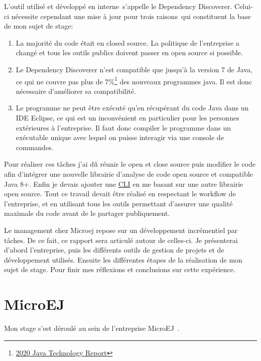 \documentclass[french,a4paper,12pt]{report}
\begin{document}
L’outil utilisé et développé en interne s’appelle le Dependency Discoverer. Celui-ci nécessite cependant une mise à jour pour trois raisons qui constituent la base de mon sujet de stage:

\begin{enumerate}
\item  La majorité du code était en closed source. La politique de l’entreprise a changé et tous les outils publics doivent passer en open source si possible.
\item Le Dependency Discoverer n’est compatible que jusqu’à la version 7 de Java, ce qui ne couvre pas plus de 7\%\footnote{\href{https://www.jrebel.com/blog/2020-java-technology-report}{2020 Java Technology Report}} des nouveaux programmes java. Il est donc nécessaire d’améliorer sa compatibilité. 
\item  Le programme ne peut être exécuté qu’en récupérant du code Java dans un IDE Eclipse, ce qui est un inconvénient en particulier pour les personnes extérieures à l’entreprise. Il faut donc compiler le programme dans un exécutable unique avec lequel on puisse interagir via une console de commandes.
\end{enumerate}

Pour réaliser ces tâches j’ai dû réunir le open et close source puis modifier le code afin d’intégrer une nouvelle librairie d’analyse de code open source et compatible Java 8+. Enfin je devais ajouter une \hyperlink{CLI}{CLI} en me basant sur une autre librairie open source.
Tout ce travail devait être réalisé en respectant le workflow de l’entreprise, et en utilisant tous les outils permettant d’assurer une qualité maximale du code avant de le partager publiquement.

Le management chez Microej repose sur un développement incrémentiel par tâches. De ce fait, ce rapport sera articulé autour de celles-ci. Je présenterai d’abord l’entreprise, puis les différents outils de gestion de projets et de développement utilisés. Ensuite les différentes étapes de la réalisation de mon sujet de stage. Pour finir mes réflexions et conclusions sur cette expérience. 

\chapter{MicroEJ}

Mon stage s’est déroulé au sein de l’entreprise MicroEJ .\\

\bigskip
\end{document}
